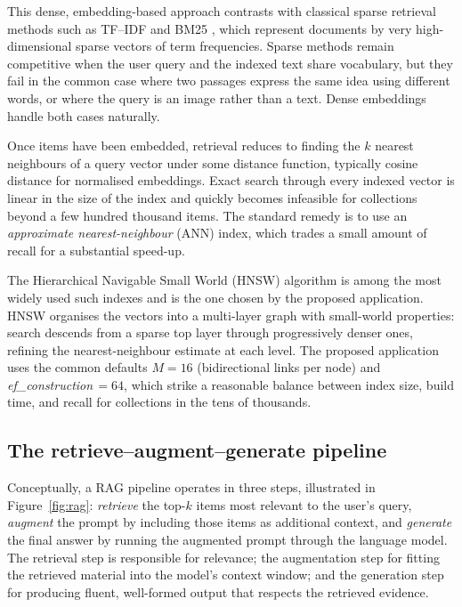 This dense, embedding-based approach contrasts with classical sparse retrieval methods such as TF--IDF \cite{sparckjones1972idf} and BM25 \cite{robertson2009bm25}, which represent documents by very high-dimensional sparse vectors of term frequencies. Sparse methods remain competitive when the user query and the indexed text share vocabulary, but they fail in the common case where two passages express the same idea using different words, or where the query is an image rather than a text. Dense embeddings handle both cases naturally.

Once items have been embedded, retrieval reduces to finding the \(k\) nearest neighbours of a query vector under some distance function, typically cosine distance for normalised embeddings. Exact search through every indexed vector is linear in the size of the index and quickly becomes infeasible for collections beyond a few hundred thousand items. The standard remedy is to use an \emph{approximate nearest-neighbour} (ANN) index, which trades a small amount of recall for a substantial speed-up.

The Hierarchical Navigable Small World (HNSW) algorithm \cite{malkov2018hnsw} is among the most widely used such indexes and is the one chosen by the proposed application. HNSW organises the vectors into a multi-layer graph with small-world properties: search descends from a sparse top layer through progressively denser ones, refining the nearest-neighbour estimate at each level. The proposed application uses the common defaults \(M = 16\) (bidirectional links per node) and \textit{ef\_construction}\,\(= 64\), which strike a reasonable balance between index size, build time, and recall for collections in the tens of thousands.

\subsection{The retrieve--augment--generate pipeline}

Conceptually, a RAG pipeline operates in three steps, illustrated in Figure~\ref{fig:rag}: \emph{retrieve} the top-\(k\) items most relevant to the user's query, \emph{augment} the prompt by including those items as additional context, and \emph{generate} the final answer by running the augmented prompt through the language model. The retrieval step is responsible for relevance; the augmentation step for fitting the retrieved material into the model's context window; and the generation step for producing fluent, well-formed output that respects the retrieved evidence.

